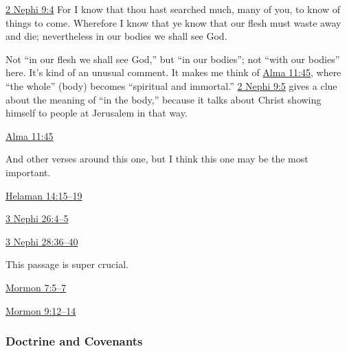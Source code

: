 		\begin{compactdesc}
			\item[{\hyperref[2NEPHI-9-4]{2 Nephi 9:4}}] For I know that thou hast searched much, many of you, to know of things to come. Wherefore I know that ye know that our flesh must waste away and die; nevertheless in our bodies we shall see God.
				\begin{compactitem}
					\item Not ``in our flesh we shall see God,'' but ``in our bodies''; not ``with our bodies'' here. It's kind of an unusual comment. It makes me think of \hyperref[ALMA-11-45]{Alma 11:45}, where ``the whole'' (body) becomes ``spiritual and immortal.'' \hyperref[2NEPHI-9-5]{2 Nephi 9:5} gives a clue about the meaning of ``in the body,'' because it talks about Christ showing himself to people at Jerusalem in that way.
				\end{compactitem}
			\item[{\hyperref[ALMA-11-45]{Alma 11:45}}]
				\begin{compactitem}
					\item And other verses around this one, but I think this one may be the most important.
				\end{compactitem}
			\item[{\hyperref[HELAMAN-14-15]{Helaman 14:15--19}}]
			\item[{\hyperref[3NEPHI-26-4]{3 Nephi 26:4--5}}]
			\item[{\hyperref[3NEPHI-28-36]{3 Nephi 28:36--40}}] \phantom{.}
				\begin{compactitem}
					\item This passage is super crucial.
				\end{compactitem}
			\item[{\hyperref[MORMON-7-5]{Mormon 7:5--7}}]
			\item[{\hyperref[MORMON-9-12]{Mormon 9:12--14}}]
		\end{compactdesc}
		
	\subsubsection{Doctrine and Covenants} %
		\label{RESURRECTION-DC}
	
		
